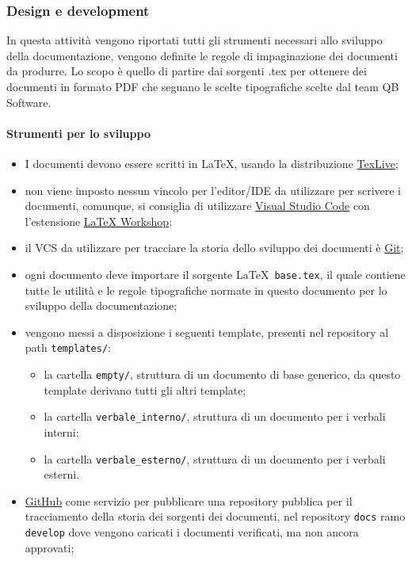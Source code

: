    \subsubsection{Design e development}
        In questa attività vengono riportati tutti gli strumenti necessari allo sviluppo della documentazione, vengono definite le regole di impaginazione dei documenti da produrre. Lo scopo è quello di partire dai sorgenti .tex per ottenere dei documenti in formato PDF che seguano le scelte tipografiche scelte dal team QB Software.
    
        \paragraph{Strumenti per lo sviluppo}  \label{doc:tools}
            \begin{itemize}
                \item I documenti devono essere scritti in \LaTeX, usando la distribuzione \href{https://tug.org/texlive/}{TexLive};
                \item non viene imposto nessun vincolo per l'editor/IDE da utilizzare per scrivere i documenti, comunque, si consiglia di utilizzare \href{https://code.visualstudio.com/}{Visual Studio Code} con l'estensione \href{https://marketplace.visualstudio.com/items?itemName=James-Yu.latex-workshop}{LaTeX Workshop};
                \item il VCS da utilizzare per tracciare la storia dello sviluppo dei documenti è \href{https://git-scm.com/}{Git};
                \item ogni documento deve importare il sorgente \LaTeX\ \verb|base.tex|, il quale contiene tutte le utilità e le regole tipografiche normate in questo documento per lo sviluppo della documentazione;
                \item vengono messi a disposizione i seguenti template, presenti nel repository al path \verb|templates/|:
                \begin{itemize}
                    \item la cartella \verb|empty/|, struttura di un documento di base generico, da questo template derivano tutti gli altri template;
                    \item la cartella \verb|verbale_interno/|, struttura di un documento per i verbali interni;
                    \item la cartella \verb|verbale_esterno/|, struttura di un documento per i verbali esterni.
                \end{itemize}
                \item \href{https://github.com/QB-Software-swe/docs}{GitHub} come servizio per pubblicare una repository pubblica per il tracciamento della storia dei sorgenti dei documenti, nel repository \verb|docs| ramo \verb|develop| dove vengono caricati i documenti verificati, ma non ancora approvati;
            \end{itemize}
    
